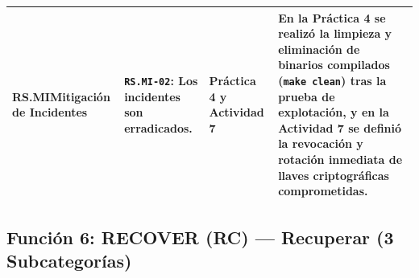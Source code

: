 \documentclass[letterpaper,11pt]{article}
\begin{document}
\begin{longtable}{|L{2.8cm}|L{4.5cm}|L{2.9cm}|L{6.5cm}|}
\textbf{RS.MI}\newline Mitigación de Incidentes &
\textbf{\texttt{RS.MI-02}}: Los incidentes son erradicados. &
\textbf{Práctica 4 y Actividad 7} &
En la \textbf{Práctica 4} se realizó la limpieza y eliminación de binarios compilados (\texttt{make clean}) tras la prueba de explotación, y en la \textbf{Actividad 7} se definió la revocación y rotación inmediata de llaves criptográficas comprometidas. \\
\hline
\end{longtable}
\endgroup

\subsection{Función 6: RECOVER (RC) --- Recuperar (3 Subcategorías)}
\end{document}
